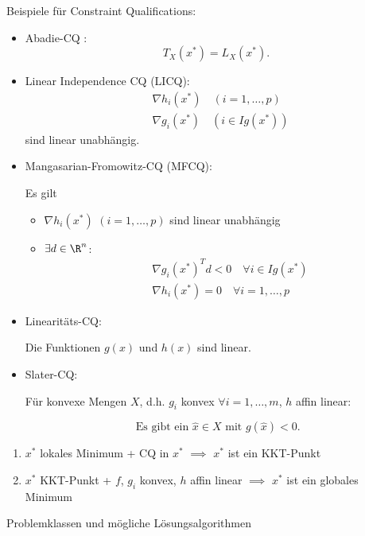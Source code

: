 Beispiele für Constraint Qualifications:
\begin{itemize}
	\item Abadie-CQ :
		\[
		T_{X}(x^{*})=L_{X}({x}^{*})
		.\] 
	\item Linear Independence CQ (LICQ): 
		\begin{align*}
			&\nabla h_{i}({x}^{*}) \quad (i=1, \ldots, p) \\ 
			&\nabla g_{i}({x}^{*})\quad (i \in Ig({x}^{*}) )
		\end{align*}
		  sind linear unabhängig.
	\item Mangasarian-Fromowitz-CQ (MFCQ):

		Es gilt
		\begin{itemize}
			\item $\nabla h_{i}({x}^{*})$ $(i=1, \ldots, p)$ sind linear unabhängig
			\item $\exists d \in \R^{n}$:
				\begin{align*}
				&\nabla g_{i}({x}^{*})^{T}d < 0 \quad \forall i \in Ig({x}^{*}) \\
				&\nabla h_{i}({x}^{*})=0\quad \forall i=1, \ldots, p
				\end{align*}
		\end{itemize}
	\item Linearitäts-CQ:

		Die Funktionen $g(x)$ und $h(x)$ sind linear.
	\item Slater-CQ:

		Für konvexe Mengen $X$, d.h. $g_{i}$ konvex $\forall i=1, \ldots, m$, $h$ affin linear:

		\[
			\text{ Es gibt ein } \hat{x} \in X \text{ mit } g(\hat{x}) < 0
		.\] 
\end{itemize}

\begin{satz}
\label{thm:optinumsatzletzter}
\begin{enumerate}[label=(\alph{enumi})]
	\item ${x}^{*}$ lokales Minimum + CQ in ${x}^{*}$ $\implies$ ${x}^{*}$ ist ein KKT-Punkt
	\item ${x}^{*}$ KKT-Punkt + $f$, $g_{i}$ konvex, $h$ affin linear $\implies$ ${x}^{*}$ ist ein globales Minimum
\end{enumerate}
\end{satz}

Problemklassen und mögliche Lösungsalgorithmen


